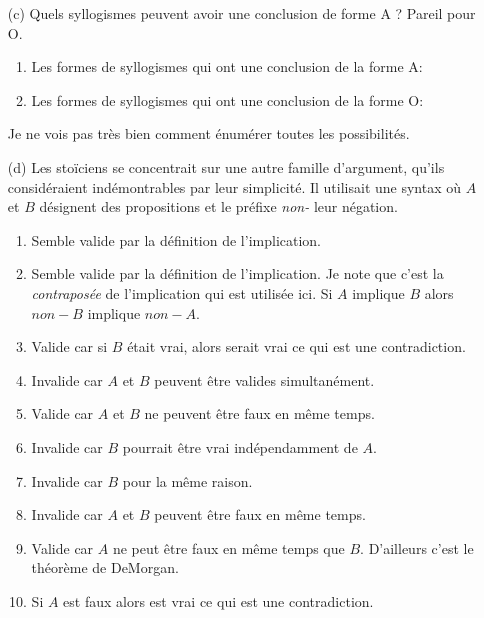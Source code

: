 \documentclass[fleqn,a4paper,nobib]{tufte-handout}
\begin{document}
\begin{enumerate}[label=(\alph*)]
    \item[(c)] Quels syllogismes peuvent avoir une conclusion de forme A ? Pareil pour O.
        \begin{enumerate}[label=(\arabic*)]
            \item Les formes de syllogismes qui ont une conclusion de la forme A:
            \item Les formes de syllogismes qui ont une conclusion de la forme O:
        \end{enumerate}
        Je ne vois pas très bien comment énumérer toutes les possibilités.
    \item[(d)] Les stoïciens se concentrait sur une autre famille d'argument, qu'ils
    considéraient indémontrables par leur simplicité. Il utilisait une syntax où $A$ et
    $B$ désignent des propositions et le préfixe \textit{non-} leur négation. 
        \begin{enumerate}[label=(\arabic*)]
            \item {} Semble valide par la définition de l'implication.
            \item {} Semble valide par la définition de l'implication.
            Je note que c'est la \textit{contraposée} de l'implication qui est utilisée ici. Si $A$ implique $B$ alors
            $non-B$ implique $non-A$.
            \item {} Valide car si $B$ était vrai, alors 
            serait vrai ce qui est une contradiction.
            \item {} Invalide car $A$ et $B$ peuvent être valides simultanément.
            \item {} Valide car $A$ et $B$ ne peuvent être faux en même temps.
            \item {} Invalide car $B$ pourrait être vrai indépendamment de $A$.
            \item {} Invalide car $B$ pour la même raison.
            \item {} Invalide car $A$ et $B$ peuvent être faux en même temps.
            \item {} Valide car $A$ ne peut être faux en même temps que $B$.
            D'ailleurs c'est le théorème de DeMorgan.
            \item {} Si $A$ est faux alors  est vrai ce qui est une contradiction.
        \end{enumerate}
\end{enumerate}
\end{document}
